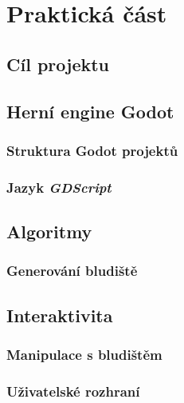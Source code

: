 \part{Praktická část}

\chapter{Cíl projektu}

\chapter{Herní engine Godot}

\section{Struktura Godot projektů}

\section{Jazyk \textit{GDScript}}

\chapter{Algoritmy}

\section{Generování bludiště}

\chapter{Interaktivita}

\section{Manipulace s bludištěm}

\section{Uživatelské rozhraní}
